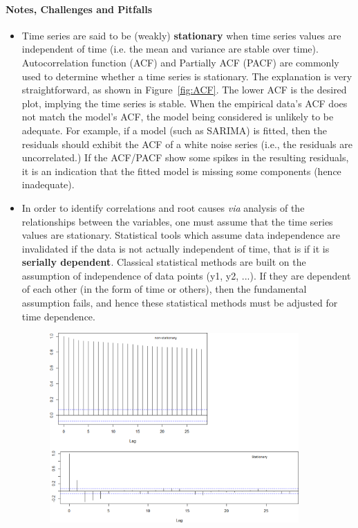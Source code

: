 \paragraph{Notes, Challenges and Pitfalls}
 \begin{itemize}[noitemsep]
\item Time series are said to be (weakly) \textbf{stationary} when time series values are independent of time (i.e. the mean and variance are stable over time). Autocorrelation function (ACF) and Partially ACF (PACF) are commonly used to determine whether a time series is stationary. The explanation is very straightforward, as shown in Figure~\ref{fig:ACF}. The lower ACF is the desired plot, implying the time series is stable. When the empirical data's ACF does not match the model's ACF, the model being considered is unlikely to be adequate. For example, if a model (such as SARIMA) is fitted, then the residuals should exhibit the ACF of a white noise series (i.e., the residuals are uncorrelated.) If the ACF/PACF show some spikes in the resulting residuals, it is an indication that the fitted model is missing some components (hence inadequate).
\item In order to identify correlations and root causes \textit{via} analysis of the relationships between the variables, one must assume that the time series values are stationary. Statistical tools which assume data independence are invalidated if the data is not actually independent of time, that is if it is \textbf{serially dependent}. Classical statistical methods are built on the assumption of independence of data points (y1, y2, ...). If they are dependent of each other (in the form of time or others), then the fundamental assumption fails, and hence these statistical methods must be adjusted for time dependence.
\begin{figure}[t]
\centering
\includegraphics[width=0.90\textwidth]{images/TS/ACF_example.png}

\end{figure}
\end{itemize}
